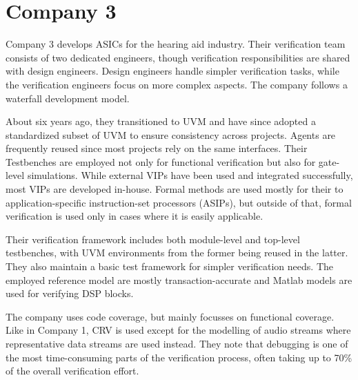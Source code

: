 \section{Company 3} %

Company 3 develops ASICs for the hearing aid industry. Their verification team consists of two dedicated engineers,
though verification responsibilities are shared with design engineers. Design engineers handle simpler verification
tasks, while the verification engineers focus on more complex aspects. The company follows a waterfall development model.

About six years ago, they transitioned to UVM and have since adopted a standardized subset of UVM to ensure
consistency across projects. Agents are frequently reused since most projects rely on the same interfaces. Their
Testbenches are employed not only for functional verification but also for gate-level simulations. While external
VIPs have been used and integrated successfully, most VIPs are developed in-house. Formal methods are used mostly for
their to application-specific instruction-set processors (ASIPs), but outside of that, formal verification is used
only in cases where it is easily applicable.

Their verification framework includes both module-level and top-level testbenches, with UVM environments from the
former being reused in the latter. They also maintain a basic test framework for simpler verification needs. The
employed reference model are mostly transaction-accurate and Matlab models are used for verifying DSP blocks.

The company uses code coverage, but mainly focusses on functional coverage. Like in Company 1, CRV is used except for
the modelling of audio streams where representative data streams are used instead. They note that debugging is one of
the most time-consuming parts of the verification process, often taking up to 70\% of the overall verification effort.

